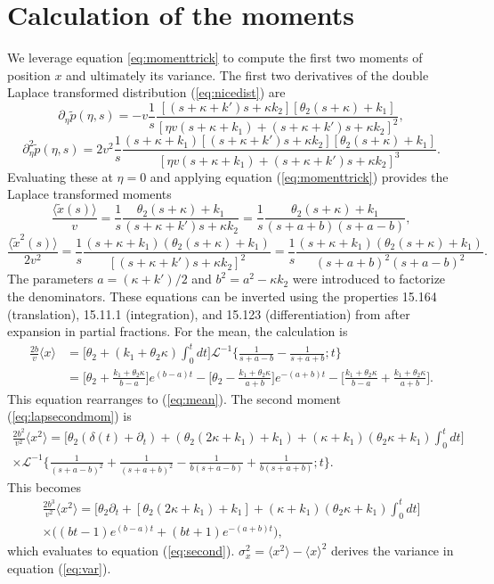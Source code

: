 \documentclass[]{agujournal2018}
\newcommand\be{\begin{equation}}
\newcommand\ee{\end{equation}}
\newcommand\bra{\langle}
\newcommand\ket{\rangle}
\newcommand\tp{\tilde{p}}
\newcommand\El{\mathcal{L}}
\begin{document}
\section{Calculation of the moments}
\label{sec:appendixB}
We leverage equation \ref{eq:momenttrick} to compute the first two moments of position $x$ and ultimately its variance. The first two derivatives of the double Laplace transformed distribution (\ref{eq:nicedist}) are
\be \partial_\eta \tp(\eta,s) = -v \frac{1}{s}\frac{[(s+\kappa + k')s + \kappa k_2][\theta_2(s+\kappa) + k_1]}{[\eta v(s+\kappa +k_1) + (s+ \kappa + k')s+\kappa k_2]^2},\ee
\be \partial_\eta^2 \tp(\eta,s) = 2v^2 \frac{1}{s} \frac{(s+\kappa+k_1)[(s+\kappa + k')s+\kappa k_2][\theta_2(s+\kappa) + k_1]}{[\eta v(s+\kappa + k_1) + (s+\kappa + k')s+ \kappa k_2]^3}.\ee
Evaluating these at $\eta=0$ and applying equation (\ref{eq:momenttrick}) provides the Laplace transformed moments
\be  \frac{\bra\tilde{x}(s)\ket} {v} = \frac{1}{s}\frac{\theta_2(s+\kappa)+k_1}{(s+\kappa+k')s+\kappa k_2} = \frac{1}{s} \frac{\theta_2(s+\kappa)+k_1}{(s+a+b)(s+a-b)}\label{eq:lapmean},\ee
\be \frac{\bra \tilde{x}^2(s) \ket}{2v^2} = \frac{1}{s} \frac{(s+\kappa+k_1)(\theta_2(s+\kappa)+k_1)}{[(s+\kappa+k')s+\kappa k_2]^2}=  \frac{1}{s}\frac{(s+\kappa+k_1)(\theta_2(s+\kappa)+k_1)}{(s+a+b)^2(s+a-b)^2}.\label{eq:lapsecondmom}\ee
The parameters $a= (\kappa+k')/2$ and $b^2 = a^2 -\kappa k_2$ were introduced to factorize the denominators.
These equations can be inverted using the properties 15.164 (translation), 15.11.1 (integration), and 15.123 (differentiation) from  \citet{Arfken1985} after expansion in partial fractions.
For the mean, the calculation is
\begin{align}
\frac{2b}{v}\bra x \ket &= \big[\theta_2 + (k_1+\theta_2 \kappa)\int_0^t dt\big]\El^{-1}\Big\{ \frac{1}{s+a-b}-\frac{1}{s+a+b};t\Big\}\\
&= \Big[\theta_2 + \frac{k_1+\theta_2\kappa}{b-a}\Big]e^{(b-a)t} - \Big[\theta_2 - \frac{k_1+\theta_2\kappa}{a+b}\Big]e^{-(a+b)t} - \Big[\frac{k_1+\theta_2\kappa}{b-a} + \frac{k_1+\theta_2\kappa}{a+b}\Big].
\end{align}
This equation rearranges to (\ref{eq:mean}).
The second moment (\ref{eq:lapsecondmom}) is 
\begin{multline}
\frac{2b^2}{v^2}\bra x^2 \ket = \Big[\theta_2(\delta(t) + \partial_t) + (\theta_2(2\kappa + k_1)+k_1) + (\kappa+k_1)(\theta_2\kappa+k_1)\int_0^t dt \Big] \\
\times \El^{-1}\Big\{ \frac{1}{(s+a-b)^2} + \frac{1}{(s+a+b)^2}-\frac{1}{b(s+a-b)}+\frac{1}{b(s+a+b)};t\Big\}.
\end{multline}
This becomes 
\begin{multline}
\frac{2b^3}{v^2}\bra x^2 \ket = \Big[\theta_2\partial_t + [\theta_2(2\kappa+k_1)+k_1] + (\kappa+k_1)(\theta_2\kappa+k_1)\int_0^tdt\Big]\\
\times \Big((bt-1)e^{(b-a)t}+(bt+1)e^{-(a+b)t}\Big),
\end{multline}
which evaluates to equation (\ref{eq:second}).
$\sigma_x^2 = \bra x^2 \ket - \bra x \ket^2$ derives the variance in equation (\ref{eq:var}).
\end{document}
